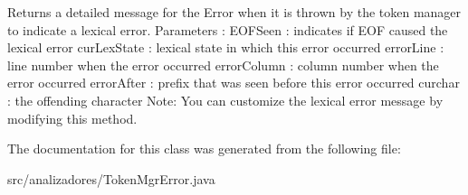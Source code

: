 Returns a detailed message for the Error when it is thrown by the token manager to indicate a lexical error. Parameters \+: E\+O\+F\+Seen \+: indicates if E\+OF caused the lexical error cur\+Lex\+State \+: lexical state in which this error occurred error\+Line \+: line number when the error occurred error\+Column \+: column number when the error occurred error\+After \+: prefix that was seen before this error occurred curchar \+: the offending character Note\+: You can customize the lexical error message by modifying this method. 

The documentation for this class was generated from the following file\+:\begin{DoxyCompactItemize}
\item 
src/analizadores/Token\+Mgr\+Error.\+java\end{DoxyCompactItemize}

